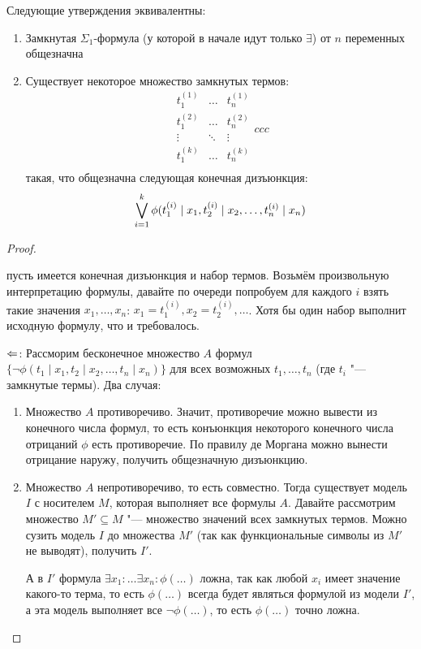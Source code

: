 \begin{theorem}[Эрбрана]
	Следующие утверждения эквивалентны:
	\begin{enumerate}
		\item
			Замкнутая $\Sigma_1$-формула (у которой в начале идут только $\exists$) от $n$ переменных общезначна
		\item
			Существует некоторое множество замкнутых термов:
			\[
			\begin{array}{ccc}
			t_1^{(1)} & \dots & t_n^{(1)} \\
			t_1^{(2)} & \dots & t_n^{(2)} \\
			\vdots & \ddots & \vdots \\
			t_1^{(k)} & \dots & t_n^{(k)} \\
			\end{array}{ccc}
			\]
			такая, что общезначна следующая конечная дизъюнкция:
			\[
				\bigvee_{i=1}^k
					\phi(t_1^{(i)}\mid x_1, t_2^{(i)} \mid x_2, \dots, t_n^{(i)} \mid x_n)
			\]
	\end{enumerate}
\end{theorem}
\begin{proof}
	\begin{description}
		\item[$\Ra$:]
			пусть имеется конечная дизъюнкция и набор термов.
			Возьмём произвольную интерпретацию формулы, давайте по очереди попробуем
			для каждого $i$ взять такие значения $x_1, \dots, x_n$:
			$x_1=t_1^{(i)}, x_2=t_2^{(i)}, \dots$.
			Хотя бы один набор выполнит исходную формулу, что и требовалось.
		\item{$\Leftarrow$:}
			Рассморим бесконечное множество $A$ формул $\{ \lnot \phi(t_1 \mid x_1, t_2 \mid x_2, \dots, t_n \mid x_n) \}$
			для всех возможных $t_1, \dots, t_n$ (где $t_i$ "--- замкнутые термы).
			Два случая:
			\begin{enumerate}
				\item
					Множество $A$ противоречиво.
					Значит, противоречие можно вывести из конечного числа формул,
					то есть конъюнкция некоторого конечного числа отрицаний $\phi$ есть противоречие.
					По правилу де Моргана можно вынести отрицание наружу, получить общезначную дизъюнкцию.
				\item
					Множество $A$ непротиворечиво, то есть совместно.
					Тогда существует модель $I$ с носителем $M$, которая выполняет все формулы $A$.
					Давайте рассмотрим множество $M' \subseteq M$ "--- множество значений всех
					замкнутых термов.
					Можно сузить модель $I$ до множества $M'$ (так как функциональные символы из $M'$
					не выводят), получить $I'$.

					А в $I'$ формула $\exists x_1 \colon \dots \exists x_n \colon \phi(\dots)$ ложна,
					так как любой $x_i$ имеет значение какого-то терма, то есть $\phi(\dots)$ всегда
					будет являться формулой из модели $I'$, а эта модель выполняет все $\lnot \phi(\dots)$,
					то есть $\phi(\dots)$ точно ложна.
			\end{enumerate}
	\end{description}
\end{proof}
